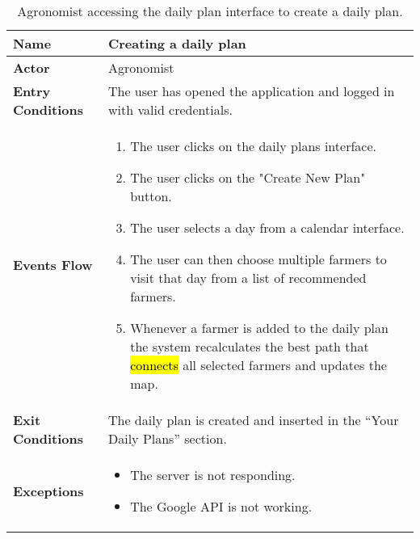 
\begin{table}[hbt!]
\centering
\small
\caption{\label{tab:agrNewPlan}Agronomist accessing the daily plan interface to create a daily plan.}
\renewcommand{\arraystretch}{1.25}
\begin{tabular}{|l|>{\raggedright\arraybackslash}m{12cm}|}
    \hline
    \textbf{Name} & Creating a daily plan\\
    \hline
   	\textbf{Actor} & Agronomist\\
    \hline
    \textbf{Entry Conditions} & The user has opened the application and logged in with valid credentials.\\    
    \hline
    \textbf{Events Flow} & \begin{enumerate}
            \item The user clicks on the daily plans interface.
            \item The user clicks on the "Create New Plan" button.
            \item The user selects a day from a calendar interface.
            \item The user can then choose multiple farmers to visit that day from a list of recommended farmers.
            \item Whenever a farmer is added to the daily plan the system recalculates the best path that \hl{connects} all selected farmers and updates the map.
       \end{enumerate} \\
    \hline
    \textbf{Exit Conditions} & The daily plan is created and inserted in the “Your Daily Plans” section.\\
    \hline
    \textbf{Exceptions} &
      \begin{itemize}
          \item The server is not responding.%
          \item The Google API is not working.%
        \end{itemize}
 \\
    \hline
\end{tabular}
\end{table}